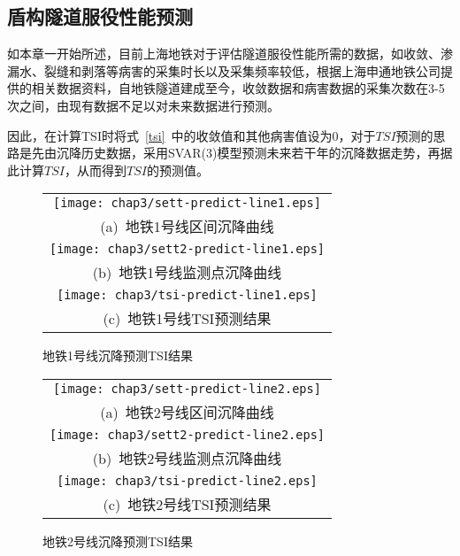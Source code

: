 \subsection{盾构隧道服役性能预测}

如本章一开始所述，目前上海地铁对于评估隧道服役性能所需的数据，如收敛、渗漏水、裂缝和剥落等病害的采集时长以及采集频率较低，根据上海申通地铁公司提供的相关数据资料，自地铁隧道建成至今，收敛数据和病害数据的采集次数在3-5次之间，由现有数据不足以对未来数据进行预测。

因此，在计算TSI时将式~\ref{tsi}~中的收敛值和其他病害值设为0，对于$TSI$预测的思路是先由沉降历史数据，采用SVAR(3)模型预测未来若干年的沉降数据走势，再据此计算$TSI$，从而得到$TSI$的预测值。

\begin{figure}[htbp] 
    \centering 
    \begin{tabular}{c} 
        \texttt{[image: chap3/sett-predict-line1.eps]} \\ 
        (a)~地铁1号线区间沉降曲线 \\
        \texttt{[image: chap3/sett2-predict-line1.eps]} \\ 
        (b)~地铁1号线监测点沉降曲线 \\
        \texttt{[image: chap3/tsi-predict-line1.eps]} \\ 
        (c)~地铁1号线TSI预测结果 \\
    \end{tabular}
    \caption{地铁1号线沉降预测TSI结果} 
    \label{fig:地铁1号线沉降预测TSI结果} 
\end{figure}

\begin{figure}[htbp] 
    \centering 
    \begin{tabular}{c} 
        \texttt{[image: chap3/sett-predict-line2.eps]} \\ 
        (a)~地铁2号线区间沉降曲线 \\
        \texttt{[image: chap3/sett2-predict-line2.eps]} \\ 
        (b)~地铁2号线监测点沉降曲线 \\
        \texttt{[image: chap3/tsi-predict-line2.eps]} \\ 
        (c)~地铁2号线TSI预测结果 \\
    \end{tabular}
    \caption{地铁2号线沉降预测TSI结果} 
    \label{fig:地铁2号线沉降预测TSI结果} 
\end{figure}

